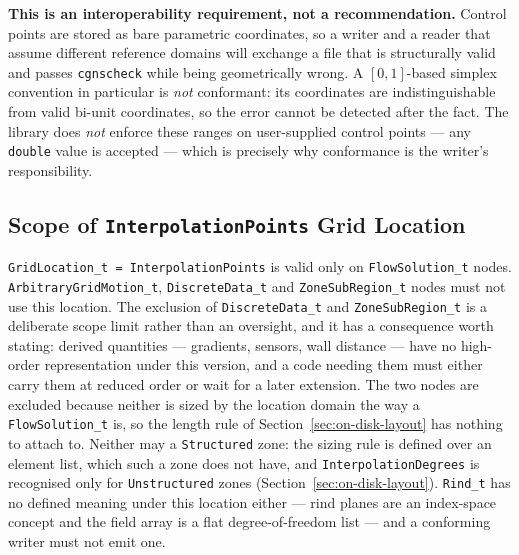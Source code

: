 \documentclass[11pt,letterpaper]{article}
\newif\ifvfourdraft
\newcommand{\vfour}[1]{\ifvfourdraft\textcolor{v4violet}{#1}\else#1\fi}
\begin{document}
\noindent\textbf{This is an interoperability requirement, not a recommendation.}  Control
points are stored as bare parametric coordinates, so a writer and a reader that assume
different reference domains will exchange a file that is structurally valid and passes
\texttt{cgnscheck} while being geometrically wrong.  A $[0,1]$-based simplex convention in
particular is \emph{not} conformant: its coordinates are indistinguishable from valid
bi-unit coordinates, so the error cannot be detected after the fact.  The library does
\emph{not} enforce these ranges on user-supplied control points --- any \texttt{double}
value is accepted --- which is precisely why conformance is the writer's responsibility.

\subsection{Scope of \texttt{InterpolationPoints} Grid Location}

{\sloppy
\texttt{GridLocation\_t = InterpolationPoints} is valid only on \texttt{FlowSolution\_t} nodes.
\texttt{ArbitraryGridMotion\_t}, \texttt{DiscreteData\_t} \vfour{and
\texttt{ZoneSubRegion\_t}} nodes must not use this location.
\vfour{The exclusion of \texttt{DiscreteData\_t} and \texttt{ZoneSubRegion\_t} is
a deliberate scope limit rather than an oversight, and it has a consequence worth
stating: derived quantities --- gradients, sensors, wall distance --- have no
high-order representation under this version, and a code needing them must either
carry them at reduced order or wait for a later extension.  The two nodes are
excluded because neither is sized by the location domain the way a
\texttt{FlowSolution\_t} is, so the length rule of
Section~\ref{sec:on-disk-layout} has nothing to attach to.}
\vfour{Neither may a \texttt{Structured} zone: the sizing rule is defined over an
element list, which such a zone does not have, and \texttt{InterpolationDegrees} is
recognised only for \texttt{Unstructured} zones (Section~\ref{sec:on-disk-layout}).
\texttt{Rind\_t} has no defined meaning under this location either --- rind planes
are an index-space concept and the field array is a flat degree-of-freedom list ---
and a conforming writer must not emit one.}
\par}
\end{document}
